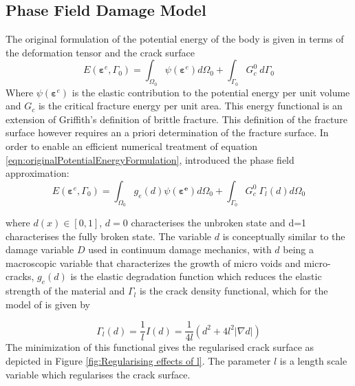 \documentclass[sn-mathphys,Numbered,draft]{sn-jnl}%
\begin{document}
\subsection{Phase Field Damage Model}

The original formulation of the potential energy of the body \cite{mumford_optimal_1989} is given in terms of the deformation tensor and the crack surface
\begin{equation}
\label{eqn:originalPotentialEnergyFormulation}
	E\left(\boldsymbol{\varepsilon}^e,\Gamma_0\right)=\int_{\Omega_0}{\psi\left(\boldsymbol{\varepsilon}^e\right)d\Omega_0}+\int_{\Gamma_0}{G_c^0\ d\Gamma_0}
\end{equation}
Where $\psi\left(\boldsymbol{\varepsilon}^e\right)$ is the elastic contribution to the potential energy per unit volume and $G_c$ is the critical fracture energy per unit area. This energy functional is an extension of Griffith’s definition of brittle fracture. This definition of the fracture surface however requires an a priori determination of the fracture surface. In order to enable an efficient numerical treatment of equation \ref{eqn:originalPotentialEnergyFormulation}, \citet{bourdin_time-discrete_2011} introduced the phase field approximation: 
\begin{equation}
	E\left(\boldsymbol{\varepsilon}^e,\Gamma_0\right)=\int_{\Omega_0}{g_e(d)\psi\left(\boldsymbol{\varepsilon^e}\right)d\Omega_0}+\int_{\Gamma_0}{G_c^0\ \Gamma_l\left(d\right)d\Omega_0}
\end{equation}

where $d\left(x\right)\in\left[0,1\right]$,  $d=0$ characterises the unbroken state and d=1 characterises the fully broken state. The variable $d$ is conceptually similar to the damage variable $D$ used in continuum damage mechanics, with $d$ being a macroscopic variable that characterizes the growth of micro voids and micro-cracks, $g_e(d)$ is the elastic degradation function which reduces the elastic strength of the material and $\Gamma_l$ is the crack density functional, which for the model of \citet{borden_phase-field_2016} is given by

\begin{equation}
	\Gamma_l\left(d\right)=\frac{1}{l}I\left(d\right)=\frac{1}{4l}\left(d^2+4l^2|\nabla d|\right)
\end{equation}
The minimization of this functional gives the regularised crack surface as depicted in Figure \ref{fig:Regularising effects of l}. The parameter $l$ is a length scale variable which regularises the crack surface.
\end{document}
